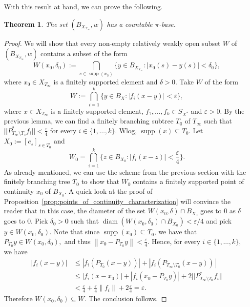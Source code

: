\documentclass[11pt,a4paper,reqno]{amsart}
\numberwithin{equation}{section}
\newcommand{\abs}[1]{\left\lvert#1\right\rvert}
\newcommand{\norm}[1]{\left\lVert#1\right\rVert}
\newcommand{\eps}{\varepsilon}
\DeclareMathOperator{\diam}{diam}
\DeclareMathOperator{\supp}{supp}
\newcommand{\1}{\mathbbm{1}}
\renewcommand{\leq}{\leqslant}
\theoremstyle{plain}
\newtheorem{theorem}{Theorem}[section]
\theoremstyle{definition}
\begin{document}
With this result at hand, we can prove the following. 

\begin{theorem}\label{thm:countably_branching_tree_has_a_countable_pi-base}
The set $(B_{X_{T_\infty}},w)$ has a countable $\pi$-base.
\end{theorem}

\begin{proof}
We will show that every non-empty relatively weakly open subset $W$ of $(B_{X_{T_\infty}},w)$ contains a subset of the form
\begin{equation*}
    W(x_0,\delta_0):=\bigcap_{s\in\supp(x_0)}\Big\{y\in B_{X_{T_\infty}}\colon \abs{x_0(s)-y(s)}<\delta_0\Big\},
\end{equation*}
where $x_0\in X_{T_\infty}$ is a finitely supported element and $\delta>0$.  Take $W$ of the form
\begin{equation*}
    W:=\bigcap_{i=1}^k\{ y\in B_X \colon |f_i(x-y)|<\varepsilon\},
\end{equation*}
where $x\in X_{T_\infty}$ is a finitely supported element, $f_1,\dots,f_k\in S_{X^*}$ and $\varepsilon>0$. By the previous lemma, we can find a finitely branching subtree $T_0$ of $T_\infty$ such that $||P^*_{T_{\infty}\setminus T_0}f_i||<\frac{\eps}{4}$ for every $i\in\{1,\dots,k\}$.  Wlog, $\supp(x)\subseteq T_0$. Let $X_0:=[e_s]_{s\in T_0}$ and 
\begin{equation*}
    W_0 =\bigcap_{i=1}^k\Big\{z\in B_{X_0}\colon |f_i(x-z)|<\frac{\varepsilon}{4}\Big\}.
\end{equation*}
As already mentioned, we can use the scheme from the previous section with the finitely branching tree $T_0$ to show that $W_0$ contains a finitely supported point of continuity $x_0$ of $B_{X_0}$. A quick look at the proof of Proposition~\ref{prop:points_of_continuity_characterization} will convince the reader that in this case, the diameter of the set $W(x_0,\delta)\cap B_{X_0}$ goes to 0 as $\delta$ goes to 0. Pick $\delta_0>0$ such that $\diam (W(x_0,\delta_0)\cap B_{X_0})<\varepsilon/4$ and pick $y\in W(x_0,\delta_0)$. Note that since $\supp(x_0)\subseteq T_0$, we have that $P_{T_0}y\in W(x_0,\delta_0),$ and thus $\norm{x_0-P_{T_0}y}<\frac{\eps}{4}$. Hence, for every $i\in\{1,\dots,k\}$, we have
\begin{align*}
    |f_i(x-y)| &\leq |f_i(P_{T_0}(x-y))| + |f_i(P_{T_{\infty}\setminus T_0}(x-y))| \\
    &\leq |f_i(x-x_0)|+|f_i(x_0-P_{T_0}y)|+2||P^*_{T_{\infty}\setminus T_0}f_i||\\
    & < \frac{\varepsilon}{4}+\frac{\varepsilon}{4}\norm{f_i}+2\frac{\varepsilon}{4} = \varepsilon.
\end{align*} Therefore $W(x_0,\delta_0)\subseteq W$. The conclusion follows.
\end{proof}
\end{document}
